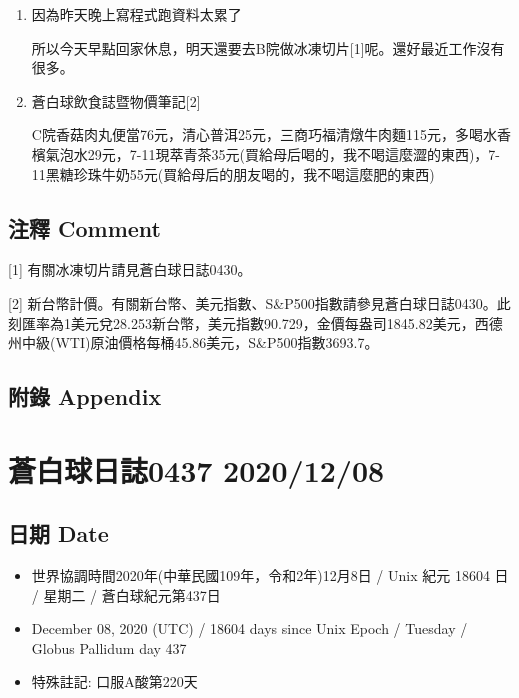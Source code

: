 \documentclass[a5paper, 10pt
]{book}
\providecommand{\tightlist}{%
  \setlength{\itemsep}{0pt}\setlength{\parskip}{0pt}}
\begin{document}
\begin{enumerate}
\def\labelenumi{\arabic{enumi}.}
\item
  因為昨天晚上寫程式跑資料太累了

  所以今天早點回家休息，明天還要去B院做冰凍切片{[}1{]}呢。還好最近工作沒有很多。
\item
  蒼白球飲食誌暨物價筆記{[}2{]}

  C院香菇肉丸便當76元，清心普洱25元，三商巧福清燉牛肉麵115元，多喝水香檳氣泡水29元，7-11現萃青茶35元(買給母后喝的，我不喝這麼澀的東西)，7-11黑糖珍珠牛奶55元(買給母后的朋友喝的，我不喝這麼肥的東西)
\end{enumerate}

\hypertarget{ux6ce8ux91cb-comment-6}{%
\subsection{注釋 Comment}\label{ux6ce8ux91cb-comment-6}}

{[}1{]} 有關冰凍切片請見蒼白球日誌0430。

{[}2{]}
新台幣計價。有關新台幣、美元指數、S\&P500指數請參見蒼白球日誌0430。此刻匯率為1美元兌28.253新台幣，美元指數90.729，金價每盎司1845.82美元，西德州中級(WTI)原油價格每桶45.86美元，S\&P500指數3693.7。

\hypertarget{ux9644ux9304-appendix-6}{%
\subsection{附錄 Appendix}\label{ux9644ux9304-appendix-6}}

\hypertarget{ux84bcux767dux7403ux65e5ux8a8c0437-20201208}{%
\section{蒼白球日誌0437
2020/12/08}\label{ux84bcux767dux7403ux65e5ux8a8c0437-20201208}}

\hypertarget{ux65e5ux671f-date-7}{%
\subsection{日期 Date}\label{ux65e5ux671f-date-7}}

\begin{itemize}
\tightlist
\item
  世界協調時間2020年(中華民國109年，令和2年)12月8日 / Unix 紀元 18604 日
  / 星期二 / 蒼白球紀元第437日
\item
  December 08, 2020 (UTC) / 18604 days since Unix Epoch / Tuesday /
  Globus Pallidum day 437
\item
  特殊註記: 口服A酸第220天
\end{itemize}
\end{document}
